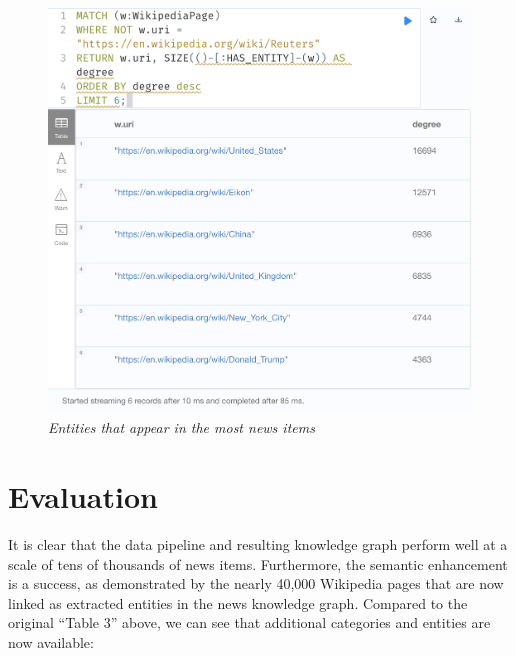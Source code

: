 \documentclass[11pt]{article}
\begin{document}
  \begin{figure}
    \centerline{\includegraphics[scale=0.5]{highest-degree-entities.png}}
    \caption{\textit{Entities that appear in the most news items}}
  \end{figure}

  \section{Evaluation}

  It is clear that the data pipeline and resulting knowledge graph perform well at a scale of tens of thousands of news items. Furthermore, the semantic enhancement is a success, as demonstrated by the nearly 40,000 Wikipedia pages that are now linked as extracted entities in the news knowledge graph. Compared to the original ``Table 3'' above, we can see that additional categories and entities are now available:
\end{document}
